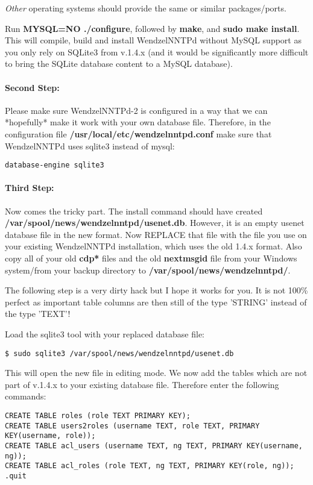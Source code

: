 {\it Other} operating systems should provide the same or similar packages/ports.

Run {\bf MYSQL=NO ./configure}, followed by {\bf make}, and {\bf sudo make install}. This will compile, build and install WendzelNNTPd without MySQL support as you only rely on SQLite3 from v.1.4.x (and it would be significantly more difficult to bring the SQLite database content to a MySQL database).

\paragraph*{Second Step:} Please make sure WendzelNNTPd-2 is configured in a way that we can *hopefully* make it work with your own database file. Therefore, in the configuration file {\bf /usr/local/etc/wendzelnntpd.conf} make sure that WendzelNNTPd uses sqlite3 instead of mysql:

\begin{verbatim}
database-engine sqlite3
\end{verbatim}

\paragraph*{Third Step:}
Now comes the tricky part. The install command should have created
{\bf /var/spool/news/wendzelnntpd/usenet.db}.
However, it is an empty usenet database file in the new format.
Now REPLACE that file with the file you use on your existing WendzelNNTPd installation, which uses the old 1.4.x format. Also copy all of your old {\bf cdp*} files and the old {\bf nextmsgid} file from your Windows system/from your backup directory to {\bf /var/spool/news/wendzelnntpd/}. 

The following step is a very dirty hack but I hope it works for you. It is not 100\% perfect as important table columns are then still of the type 'STRING' instead of the type 'TEXT'!

Load the sqlite3 tool with your replaced database file:

\begin{verbatim}
$ sudo sqlite3 /var/spool/news/wendzelnntpd/usenet.db
\end{verbatim}

This will open the new file in editing mode. We now add the tables which are not part of v.1.4.x to your existing database file. Therefore enter the following commands:

\begin{verbatim}
CREATE TABLE roles (role TEXT PRIMARY KEY);
CREATE TABLE users2roles (username TEXT, role TEXT, PRIMARY KEY(username, role));
CREATE TABLE acl_users (username TEXT, ng TEXT, PRIMARY KEY(username, ng));
CREATE TABLE acl_roles (role TEXT, ng TEXT, PRIMARY KEY(role, ng));
.quit
\end{verbatim}


